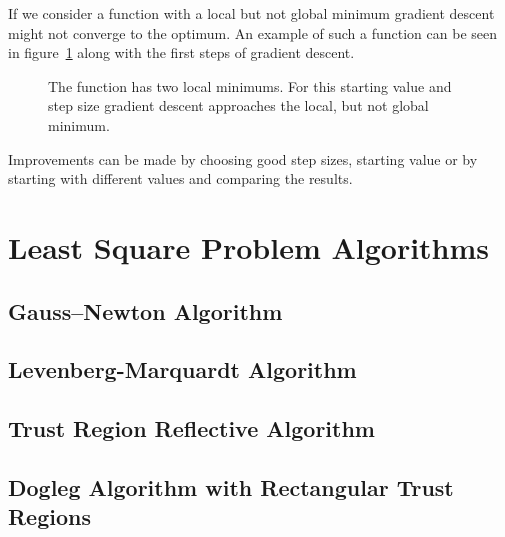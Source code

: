 If we consider a function with a local but not global minimum gradient descent might not converge to the optimum. An example of such a function can be seen in figure~\ref{fig:grad_descent_global_min_not_found} along with the first steps of gradient descent.

\begin{figure}
	\centering
	\caption{The function has two local minimums. For this starting value and step size gradient descent approaches the local, but not global minimum.}
	\label{fig:grad_descent_global_min_not_found}
\end{figure}

Improvements can be made by choosing good step sizes, starting value or by starting with different values and comparing the results.

\section{Least Square Problem Algorithms}


\subsection{Gauss–Newton Algorithm}

\subsection{Levenberg-Marquardt Algorithm}

\subsection{Trust Region Reflective Algorithm}

\subsection{Dogleg Algorithm with Rectangular Trust Regions}